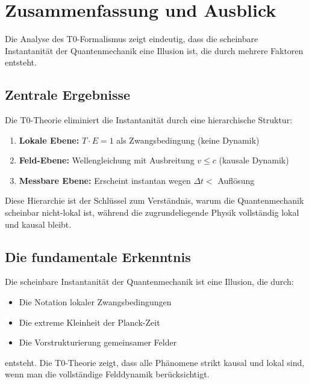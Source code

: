 \documentclass[12pt,a4paper]{article}
\begin{document}
	\section{Zusammenfassung und Ausblick}
	
	Die Analyse des T0-Formalismus zeigt eindeutig, dass die scheinbare Instantanität der Quantenmechanik eine Illusion ist, die durch mehrere Faktoren entsteht.
	
	\subsection{Zentrale Ergebnisse}
	
	Die T0-Theorie eliminiert die Instantanität durch eine hierarchische Struktur:
	
	\begin{enumerate}
		\item \textbf{Lokale Ebene:} $T \cdot E = 1$ als Zwangsbedingung (keine Dynamik)
		\item \textbf{Feld-Ebene:} Wellengleichung mit Ausbreitung $v \leq c$ (kausale Dynamik)
		\item \textbf{Messbare Ebene:} Erscheint instantan wegen $\Delta t < $ Auflösung
	\end{enumerate}
	
	Diese Hierarchie ist der Schlüssel zum Verständnis, warum die Quantenmechanik scheinbar nicht-lokal ist, während die zugrundeliegende Physik vollständig lokal und kausal bleibt.
	
	\subsection{Die fundamentale Erkenntnis}
	
	\begin{tcolorbox}[colback=t0yellow!10!white, colframe=t0yellow!75!black, title=Kernaussage]
		Die scheinbare Instantanität der Quantenmechanik ist eine Illusion, die durch:
		\begin{itemize}
			\item Die Notation lokaler Zwangsbedingungen
			\item Die extreme Kleinheit der Planck-Zeit
			\item Die Vorstrukturierung gemeinsamer Felder
		\end{itemize}
		entsteht. Die T0-Theorie zeigt, dass alle Phänomene strikt kausal und lokal sind, wenn man die vollständige Felddynamik berücksichtigt.
	\end{tcolorbox}
	
\end{document}
